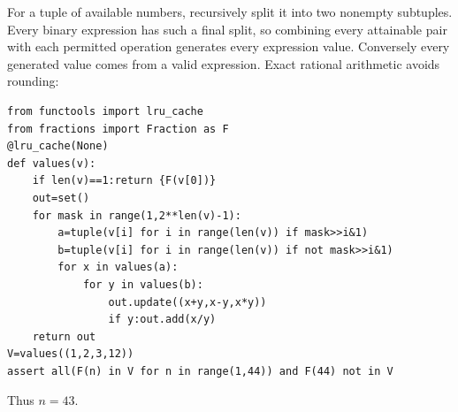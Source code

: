 For a tuple of available numbers, recursively split it into two nonempty subtuples. Every binary expression has such a final split, so combining every attainable pair with each permitted operation generates every expression value. Conversely every generated value comes from a valid expression. Exact rational arithmetic avoids rounding:
\begin{verbatim}
from functools import lru_cache
from fractions import Fraction as F
@lru_cache(None)
def values(v):
    if len(v)==1:return {F(v[0])}
    out=set()
    for mask in range(1,2**len(v)-1):
        a=tuple(v[i] for i in range(len(v)) if mask>>i&1)
        b=tuple(v[i] for i in range(len(v)) if not mask>>i&1)
        for x in values(a):
            for y in values(b):
                out.update((x+y,x-y,x*y))
                if y:out.add(x/y)
    return out
V=values((1,2,3,12))
assert all(F(n) in V for n in range(1,44)) and F(44) not in V
\end{verbatim}
Thus $\boxed{n=43}$.

